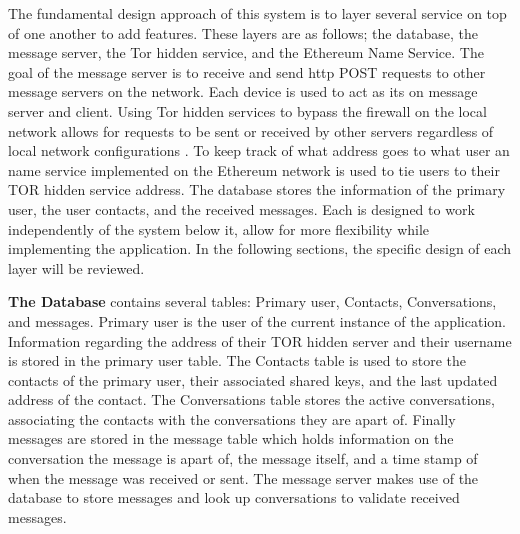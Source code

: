 \documentclass[../main/main.tex]{subfiles}
\begin{document}
	
The fundamental design approach of this system is to layer several service on top of one another to add features. 
These layers are as follows; the database, the message server, the Tor hidden service, and the Ethereum Name Service. 
The goal of the message server is to receive and send http POST requests to other message servers on the network. 
Each device is used to act as its on message server and client. 
Using Tor hidden services to bypass the firewall on the local network allows for requests to be sent or received by other servers regardless of local network configurations \cite{TCP}.
To keep track of what address goes to what user an name service implemented on the Ethereum network is used to tie users to their TOR hidden service address. 
The database stores the information of the primary user, the user contacts, and the received messages.
Each is designed to work independently of the system below it, allow for more flexibility while implementing the application. 
In the following sections, the specific design of each layer will be reviewed.

\textbf{The Database} contains several tables: Primary user, Contacts, Conversations, and messages. 
Primary user is the user of the current instance of the application. 
Information regarding the address of their TOR hidden server and their username is stored in the primary user table. 
The Contacts table is used to store the contacts of the primary user, their associated shared keys, and the last updated address of the contact. 
The Conversations table stores the active conversations, associating the contacts with the conversations they are apart of.
Finally messages are stored in the message table which holds information on the conversation the message is apart of, the message itself, and a time stamp of when the message was received or sent. 
The message server makes use of the database to store messages and look up conversations to validate received messages.
\end{document}
